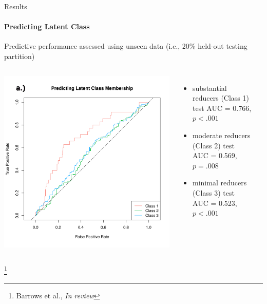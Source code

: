 \documentclass[aspectratio=169]{beamer}
\newcommand\blfootnote[1]{%
	\begingroup
	\renewcommand\thefootnote{}\footnote{#1}%
	\addtocounter{footnote}{-1}%
	\endgroup
}
\newcommand{\reviewcite}{\blfootnote{\tiny Barrows et al., \textit{In review}}}
\begin{document}
\begin{frame}{Results}
	\framesubtitle{Predicting Latent Class}
	Predictive performance assessed using unseen data (i.e.,  20\% held-out testing partition)
	\begin{columns}
		\includegraphics[width=\columnwidth]{lca_roc}
		\begin{itemize}
			\scriptsize
			\item \textcolor{class1}{substantial reducers (Class 1)} test AUC = 0.766, $p<.001$
			\item \textcolor{class2}{moderate reducers (Class 2)} test AUC = 0.569, $p=.008$ 
			\item \textcolor{class3}{minimal reducers (Class 3)} test AUC = 0.523, $p<.001$ 
		\end{itemize}
		
		\vspace{1cm}
		
		\begin{center}
		\end{center}
	\end{columns}
	\reviewcite

\end{frame}
\end{document}
